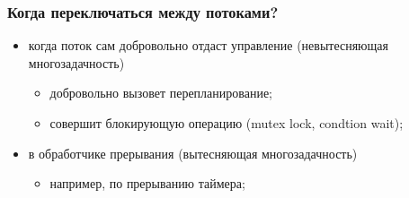 \begin{frame}
\frametitle{Когда переключаться между потоками?}

\begin{itemize}
  \item когда поток сам добровольно отдаст управление (невытесняющая
        многозадачность)
        \begin{itemize}
          \item добровольно вызовет перепланирование;
          \item совершит блокирующую операцию (mutex lock, condtion wait);
        \end{itemize}
  \item в обработчике прерывания (вытесняющая многозадачность)
        \begin{itemize}
          \item например, по прерыванию таймера;
        \end{itemize}
\end{itemize}
\end{frame}

